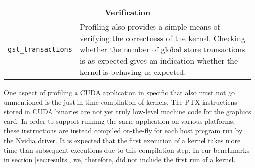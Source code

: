 \begin{longtable}{p{} p{}}
    \\
    \multicolumn{2}{c}{\textbf{Verification}} \\
    \hline
    \hline
    \raggedright \texttt{gst\_\allowbreak transactions} & Profiling also provides a simple means of verifying the correctness of the kernel. Checking whether the number of global store transactions is as expected gives an indication whether the kernel is behaving as expected. \\
    \hline
\end{longtable}

One aspect of profiling a CUDA application in specific that also must not go unmentioned is the just-in-time compilation of kernels. The PTX instructions stored in CUDA binaries are not yet truly low-level machine code for the graphics card. In order to support running the same application on various platforms, these instructions are instead compiled on-the-fly for each host program run by the Nvidia driver. It is expected that the first execution of a kernel takes more time than subsequent executions due to this compilation step. In our benchmarks in section \ref{sec:results}, we, therefore, did not include the first run of a kernel.